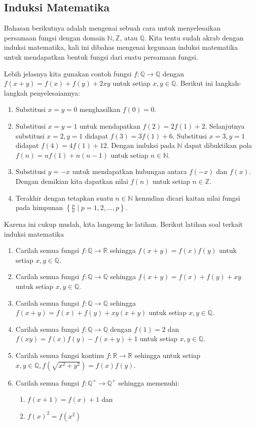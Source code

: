 \documentclass{article}
\begin{document}
\subsection{Induksi Matematika}
Bahasan berikutnya adalah mengenai sebuah cara untuk menyelesaikan persamaan fungsi dengan domain $\mathbb{N}, \mathbb{Z}$, atau $\mathbb{Q}$. Kita tentu sudah akrab dengan induksi matematika, kali ini dibahas mengenai kegunaan induksi matematika untuk mendapatkan bentuk fungsi dari suatu persamaan fungsi.

Lebih jelasnya kita gunakan contoh fungsi $f : \mathbb{Q} \rightarrow \mathbb{Q}$ dengan $f(x+y) = f(x)+f(y)+2xy$ untuk setiap $x, y \in \mathbb{Q}$. Berikut ini langkah-langkah penyelesaiannya:
\begin{enumerate}
\item Substitusi $x = y = 0$ menghasilkan $f(0) = 0$.
\item Substitusi $x = y = 1$ untuk mendapatkan $f(2) = 2f(1)+2$. Selanjutnya substitusi $x = 2, y = 1$ didapat $f(3) = 3f(1)+6$. Substitusi $x = 3, y = 1$ didapat $f(4) = 4f(1)+12$. Dengan induksi pada $\mathbb{N}$ dapat dibuktikan pola $f(n) = n f(1) + n(n-1)$ untuk setiap $n \in \mathbb{N}$.
\item Substitusi $y = -x$ untuk mendapatkan hubungan antara $f(-x)$ dan $f(x)$. Dengan demikian kita dapatkan nilai $f(n)$ untuk setiap $n \in \mathbb{Z}$.
\item Terakhir dengan tetapkan suatu $n \in \mathbb{N}$ kemudian dicari kaitan nilai fungsi pada himpunan $\left\{\frac{p}{n} \mid p = 1, 2, \dots, p\right\}$.
\end{enumerate}

Karena ini cukup mudah, kita langsung ke latihan. Berikut latihan soal terkait induksi matematika
\begin{enumerate}
\item Carilah semua fungsi $f : \mathbb{Q} \rightarrow \mathbb{R}$ sehingga $f(x+y) = f(x)f(y)$ untuk setiap $x, y \in \mathbb{Q}$.
\item Carilah semua fungsi $f : \mathbb{Q} \rightarrow \mathbb{Q}$ sehingga $f(x+y) = f(x)+f(y)+xy$ untuk setiap $x, y \in \mathbb{Q}$.
\item Carilah semua fungsi $f : \mathbb{Q} \rightarrow \mathbb{Q}$ sehingga $f(x+y) = f(x)+f(y)+xy(x+y)$ untuk setiap $x, y \in \mathbb{Q}$.
\item Carilah semua fungsi $f : \mathbb{Q} \rightarrow \mathbb{Q}$ dengan $f(1) = 2$ dan $f(xy) = f(x)f(y)-f(x+y)+1$ untuk setiap $x, y \in \mathbb{Q}$.
\item Carilah semua fungsi kontinu $f : \mathbb{R} \rightarrow \mathbb{R}$ sehingga untuk setiap $x, y \in \mathbb{Q}, f\left(\sqrt{x^2+y^2}\right) = f(x)f(y)$.
\item Carilah semua fungsi $f : \mathbb{Q}^+ \rightarrow \mathbb{Q}^+$ sehingga memenuhi:
\begin{enumerate}
\item $f(x+1) = f(x)+1$ dan
\item $f(x)^2 = f(x^2)$
\end{enumerate}
\end{enumerate}
\end{document}
